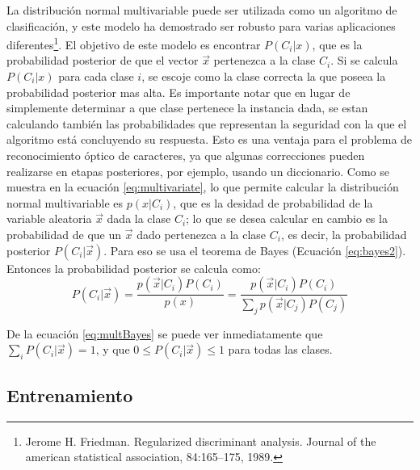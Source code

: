 \documentclass[a4paper, 11pt, oneside]{report}
\begin{document}
La distribución normal multivariable puede ser utilizada como un algoritmo de clasificación, y este modelo ha demostrado ser robusto para varias aplicaciones diferentes\footnote{Jerome H. Friedman. Regularized discriminant analysis. Journal of the american statistical association, 84:165–175, 1989.}.	El objetivo de este modelo es encontrar $P(C_i|x)$,	que es la probabilidad posterior de que el vector $\vec{x}$ pertenezca a la clase $C_i$. Si se calcula $P(C_i|x)$ para cada clase $i$, se escoje como la clase correcta la que poseea la probabilidad posterior mas alta. \newline \newline
Es importante notar que en lugar de simplemente determinar a que clase pertenece la instancia dada, se estan calculando también las probabilidades que representan la seguridad con la que el algoritmo está concluyendo su respuesta. Esto es una ventaja para el problema de reconocimiento óptico de caracteres, ya que algunas correcciones pueden realizarse en etapas posteriores, por ejemplo, usando un diccionario. \newline \newline
Como se muestra en la ecuación \eqref{eq:multivariate}, lo que permite calcular la distribución normal multivariable es $p(x|C_i)$, que es la desidad de probabilidad de la variable aleatoria $\vec{x}$ dada la clase $C_i$; lo que se desea calcular en cambio es la probabilidad de que un $\vec{x}$ dado pertenezca a la clase $C_i$, es decir, la probabilidad posterior $P(C_i|\vec{x})$. Para eso se usa el teorema de Bayes (Ecuación \ref{eq:bayes2}). Entonces la probabilidad posterior se calcula como:
	\begin{equation}\label{eq:multBayes}
		P(C_i|\vec{x}) = \frac{p(\vec{x}|C_i)P(C_i)}{p(x)} = \frac{p(\vec{x}|C_i)P(C_i)}{ \sum_j{p(\vec{x}|C_j)P(C_j)} }
	\end{equation}
	
De la ecuación \ref{eq:multBayes} se puede ver inmediatamente que $\sum_i{P(C_i|\vec{x})}=1$, y que $0 \le P(C_i|\vec{x}) \le 1$ para todas las clases.
	
\subsection{Entrenamiento}
\end{document}
